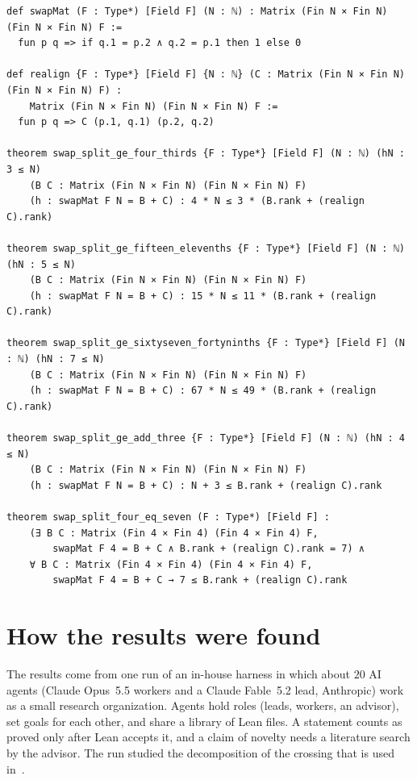 \documentclass[11pt]{amsart}
\theoremstyle{remark}
\begin{document}
{\footnotesize
\begin{verbatim}
def swapMat (F : Type*) [Field F] (N : ℕ) : Matrix (Fin N × Fin N) (Fin N × Fin N) F :=
  fun p q => if q.1 = p.2 ∧ q.2 = p.1 then 1 else 0

def realign {F : Type*} [Field F] {N : ℕ} (C : Matrix (Fin N × Fin N) (Fin N × Fin N) F) :
    Matrix (Fin N × Fin N) (Fin N × Fin N) F :=
  fun p q => C (p.1, q.1) (p.2, q.2)

theorem swap_split_ge_four_thirds {F : Type*} [Field F] (N : ℕ) (hN : 3 ≤ N)
    (B C : Matrix (Fin N × Fin N) (Fin N × Fin N) F)
    (h : swapMat F N = B + C) : 4 * N ≤ 3 * (B.rank + (realign C).rank)

theorem swap_split_ge_fifteen_elevenths {F : Type*} [Field F] (N : ℕ) (hN : 5 ≤ N)
    (B C : Matrix (Fin N × Fin N) (Fin N × Fin N) F)
    (h : swapMat F N = B + C) : 15 * N ≤ 11 * (B.rank + (realign C).rank)

theorem swap_split_ge_sixtyseven_fortyninths {F : Type*} [Field F] (N : ℕ) (hN : 7 ≤ N)
    (B C : Matrix (Fin N × Fin N) (Fin N × Fin N) F)
    (h : swapMat F N = B + C) : 67 * N ≤ 49 * (B.rank + (realign C).rank)

theorem swap_split_ge_add_three {F : Type*} [Field F] (N : ℕ) (hN : 4 ≤ N)
    (B C : Matrix (Fin N × Fin N) (Fin N × Fin N) F)
    (h : swapMat F N = B + C) : N + 3 ≤ B.rank + (realign C).rank

theorem swap_split_four_eq_seven (F : Type*) [Field F] :
    (∃ B C : Matrix (Fin 4 × Fin 4) (Fin 4 × Fin 4) F,
        swapMat F 4 = B + C ∧ B.rank + (realign C).rank = 7) ∧
    ∀ B C : Matrix (Fin 4 × Fin 4) (Fin 4 × Fin 4) F,
        swapMat F 4 = B + C → 7 ≤ B.rank + (realign C).rank
\end{verbatim}
}

\section{How the results were found}\label{sec:how}

The results come from one run of an in-house harness in which about $20$ AI agents (Claude Opus~5.5 workers and a
Claude Fable~5.2 lead, Anthropic) work as a small research organization. Agents hold roles (leads, workers, an advisor), set goals
for each other, and share a library of Lean files. A statement counts as proved only after Lean accepts it,
and a claim of novelty needs a literature search by the advisor. The run studied the decomposition of the
crossing that is used in~\cite{Cla26}.
\end{document}
